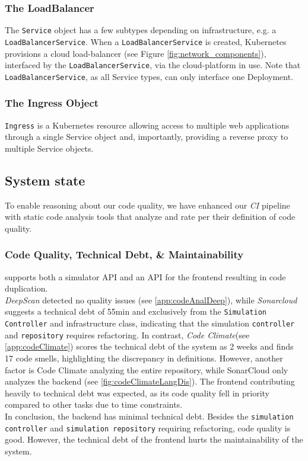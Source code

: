 \subsubsection{The LoadBalancer}
The \texttt{Service} object has a few subtypes depending on infrastructure, e.g. a \texttt{LoadBalancerService}.
When a \texttt{LoadBalancerService} is created, Kubernetes provisions a cloud load-balancer (see Figure \ref{fig:network_components}), interfaced by the \texttt{LoadBalancerService}, via the cloud-platform in use. Note that \texttt{LoadBalancerService}, as all Service types, can only interface one Deployment.

\subsubsection{The Ingress Object}
\texttt{Ingress} is a Kubernetes resource allowing access to multiple web applications through a single Service object \cite{k8sbook} and, importantly, providing a reverse proxy to multiple Service objects.

\subsection{System state}
\label{subsec:system_state}
To enable reasoning about our code quality, we have enhanced our \textit{CI} pipeline with static code analysis tools that analyze and rate \mini per their definition of code quality.

\subsubsection{Code Quality, Technical Debt, \& Maintainability}
\label{subsubsec:code_quality}
\mini supports both a simulator API and an API for the frontend resulting in code duplication.\\
\textit{DeepScan} detected no quality issues (see \ref{app:codeAnalDeep}), while \textit{Sonarcloud} suggests a technical debt of 55min and exclusively from the \texttt{Simulation Controller} and infrastructure class, indicating that the simulation \texttt{controller} and \texttt{repository} requires refactoring. In contrast, \textit{Code Climate}(see \ref{app:codeClimate}) scores the technical debt of the system as 2 weeks and finds 17 code smells, highlighting the discrepancy in definitions. However, another factor is Code Climate analyzing the entire repository, while SonarCloud only analyzes the backend (see \ref{fig:codeClimateLangDis}). The frontend contributing heavily to technical debt was expected, as its code quality fell in priority compared to other tasks due to time constraints.  \\
In conclusion, the backend has minimal technical debt. Besides the \texttt{simulation controller} and \texttt{simulation repository} requiring refactoring, code quality is good. However, the technical debt of the frontend hurts the maintainability of the system.

